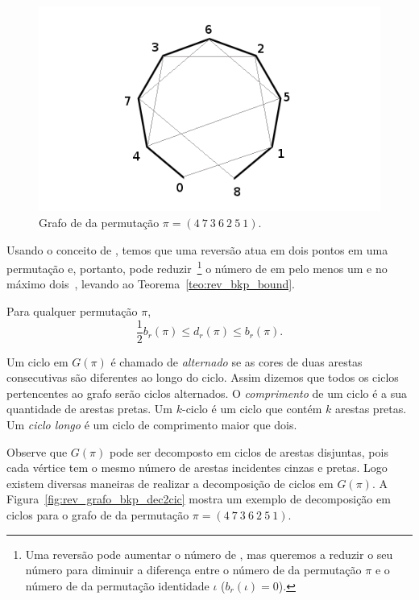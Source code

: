 \begin{figure}[h]
  \centering 
  \includegraphics[scale=0.6]{images/rev_grafo_bkp.png} 
  \caption{Grafo de \bkp{} da permutação $\pi = (4~7~3~6~2~5~1)$.}
  \label{fig:rev_grafo_bkp}
\end{figure}

Usando o conceito de \bkp{}, temos que uma reversão atua em dois pontos
em uma permutação e, portanto, pode reduzir~\footnote{Uma reversão pode
aumentar o número de \bkp{}, mas queremos a reduzir o seu número
para diminuir a diferença entre o número de \bkp{} da permutação
$\pi$ e o número de \bkp{} da permutação identidade $\iota$
($b_r(\iota) = 0$).} o número de \bkp{} em pelo menos um e no máximo
dois~\cite{BafnaPevzner*1996}, levando ao
Teorema~\ref{teo:rev_bkp_bound}.

\begin{teo}
\label{teo:rev_bkp_bound}
Para qualquer permutação $\pi$, 
\[\frac{1}{2} b_r(\pi) \leq d_r(\pi) \leq
  b_r(\pi).
\]
\end{teo}

Um ciclo em $G(\pi)$ é chamado de \textit{alternado} se as cores de duas
arestas consecutivas são diferentes ao longo do ciclo. Assim dizemos que
todos os ciclos pertencentes ao grafo serão ciclos alternados. O
\textit{comprimento} de um ciclo é a sua quantidade de arestas pretas.
Um $k$-ciclo é um ciclo que contém $k$ arestas pretas. Um \textit{ciclo
longo} é um ciclo de comprimento maior que dois.

Observe que $G(\pi)$ pode ser decomposto em ciclos de arestas disjuntas,
pois cada vértice tem o mesmo número de arestas incidentes cinzas e
pretas. Logo existem diversas maneiras de realizar a decomposição de
ciclos em $G(\pi)$. A Figura~\ref{fig:rev_grafo_bkp_dec2cic} mostra um
exemplo de decomposição em ciclos para o grafo de \bkp{} da permutação
$\pi = (4~7~3~6~2~5~1)$.

